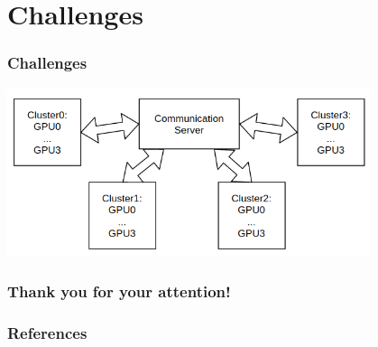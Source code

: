 \documentclass{beamer}
\begin{document}
\section{Challenges}
\begin{frame}
\frametitle{Challenges}
\centering
\includegraphics[width=0.8\textwidth]{cluster_setup.png}

\end{frame}

\begin{frame}
 \frametitle{Thank you for your attention!}
\end{frame}

\begin{frame}[allowframebreaks]
\frametitle{References}
\nocite{*}
\tiny


\end{frame}
\end{document}
